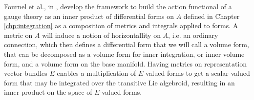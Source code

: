 Fournel et al., in \cite{Fournel2013}, develop the framework to build the action functional of a gauge theory as an inner product of differential forms on $A$ defined in Chapter \ref{chp:integration} as a composition of metrics and integrals applied to forms. A metric on $A$ will induce a notion of horizontallity on $A$, i.e. an ordinary connection, which then defines a differential form that we will call a volume form, that can be decomposed as a volume form for inner integration, or inner volume form, and a volume form on the base manifold. Having metrics on representation vector bundles $E$ enables a multiplication of $E$-valued forms to get a scalar-valued form that may be integrated over the transitive Lie algebroid, resulting in an inner product on the space of $E$-valued forms.




